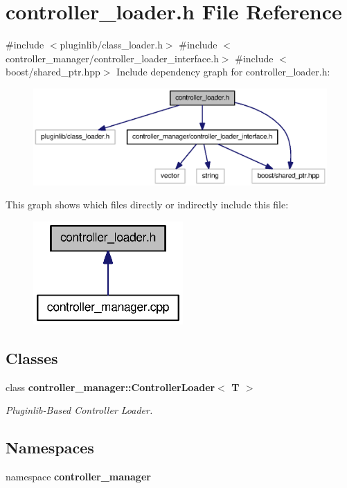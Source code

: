 \section{controller\-\_\-loader.\-h \-File \-Reference}
\label{controller__loader_8h}
{\ttfamily \#include $<$pluginlib/class\-\_\-loader.\-h$>$}\*
{\ttfamily \#include $<$controller\-\_\-manager/controller\-\_\-loader\-\_\-interface.\-h$>$}\*
{\ttfamily \#include $<$boost/shared\-\_\-ptr.\-hpp$>$}\*
\-Include dependency graph for controller\-\_\-loader.\-h\-:
\nopagebreak
\begin{figure}[H]
\begin{center}
\leavevmode
\includegraphics[width=350pt]{controller__loader_8h__incl}
\end{center}
\end{figure}
\-This graph shows which files directly or indirectly include this file\-:
\nopagebreak
\begin{figure}[H]
\begin{center}
\leavevmode
\includegraphics[width=162pt]{controller__loader_8h__dep__incl}
\end{center}
\end{figure}
\subsection*{\-Classes}
\begin{DoxyCompactItemize}
\item 
class {\bf controller\-\_\-manager\-::\-Controller\-Loader$<$ T $>$}
\begin{DoxyCompactList}\small\item\em \-Pluginlib-\/\-Based \-Controller \-Loader. \end{DoxyCompactList}\end{DoxyCompactItemize}
\subsection*{\-Namespaces}
\begin{DoxyCompactItemize}
\item 
namespace {\bf controller\-\_\-manager}
\end{DoxyCompactItemize}
